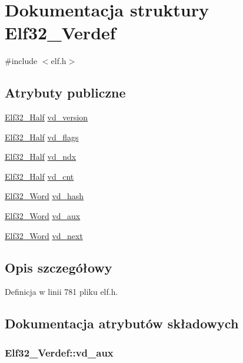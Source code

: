 \hypertarget{struct_elf32___verdef}{\section{Dokumentacja struktury Elf32\-\_\-\-Verdef}
\label{struct_elf32___verdef}
}


{\ttfamily \#include $<$elf.\-h$>$}

\subsection*{Atrybuty publiczne}
\begin{DoxyCompactItemize}
\item 
\hyperlink{elf_8h_a2ff0787d7d1bae0f251192806a2974ca}{Elf32\-\_\-\-Half} \hyperlink{struct_elf32___verdef_ad2f222a352ff9e2d92199811ff094822}{vd\-\_\-version}
\item 
\hyperlink{elf_8h_a2ff0787d7d1bae0f251192806a2974ca}{Elf32\-\_\-\-Half} \hyperlink{struct_elf32___verdef_a782382383f96808eeddb86e3db2737c3}{vd\-\_\-flags}
\item 
\hyperlink{elf_8h_a2ff0787d7d1bae0f251192806a2974ca}{Elf32\-\_\-\-Half} \hyperlink{struct_elf32___verdef_afcaa14f5175bb38ecb6ef832c2aa2232}{vd\-\_\-ndx}
\item 
\hyperlink{elf_8h_a2ff0787d7d1bae0f251192806a2974ca}{Elf32\-\_\-\-Half} \hyperlink{struct_elf32___verdef_a38c7ed683760f798e42ff3c411ea23ba}{vd\-\_\-cnt}
\item 
\hyperlink{elf_8h_af5924ece606c732e86f8263a19408e45}{Elf32\-\_\-\-Word} \hyperlink{struct_elf32___verdef_aed64e7dede5f8150f10457c420b48416}{vd\-\_\-hash}
\item 
\hyperlink{elf_8h_af5924ece606c732e86f8263a19408e45}{Elf32\-\_\-\-Word} \hyperlink{struct_elf32___verdef_a3693473efde66cb13cecda2053c91f9d}{vd\-\_\-aux}
\item 
\hyperlink{elf_8h_af5924ece606c732e86f8263a19408e45}{Elf32\-\_\-\-Word} \hyperlink{struct_elf32___verdef_ac919bdca49dff2f3a04b1328903edb71}{vd\-\_\-next}
\end{DoxyCompactItemize}


\subsection{Opis szczegółowy}


Definicja w linii 781 pliku elf.\-h.



\subsection{Dokumentacja atrybutów składowych}
\hypertarget{struct_elf32___verdef_a3693473efde66cb13cecda2053c91f9d}{
\subsubsection[{vd\-\_\-aux}]{ Elf32\-\_\-\-Verdef\-::vd\-\_\-aux}}\label{struct_elf32___verdef_a3693473efde66cb13cecda2053c91f9d}


